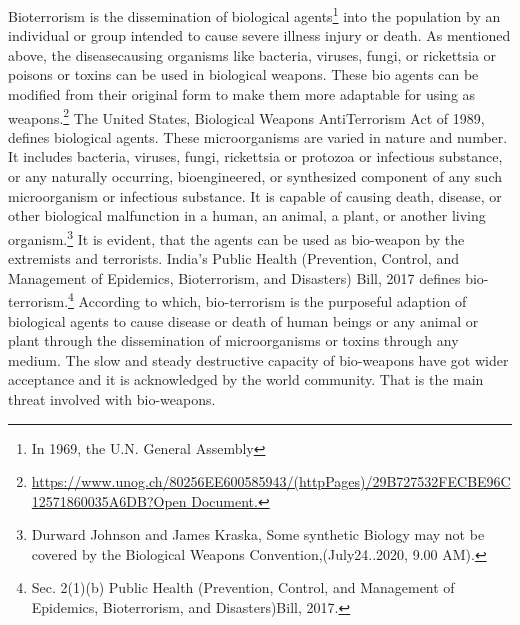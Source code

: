\begin{multicols}{2}
\noi
Bioterrorism is the dissemination of biological agents\footnote{In 1969, the U.N. General Assembly} into the population by an individual
or group intended to cause severe illness injury or death. As mentioned above, the diseasecausing organisms like bacteria, viruses, fungi, or rickettsia or poisons or toxins can be used
in biological weapons. These bio agents can be modified from their original form to make 
them more adaptable for using as weapons.\footnote{\url{https://www.unog.ch/80256EE600585943/(httpPages)/29B727532FECBE96C12571860035A6DB?}\break \url{Open Document.}} The United States, Biological Weapons AntiTerrorism Act of 1989, defines biological agents. These microorganisms are varied in nature
and number. It includes bacteria, viruses, fungi, rickettsia or protozoa or infectious substance,
or any naturally occurring, bioengineered, or synthesized component of any such
microorganism or infectious substance. It is capable of causing death, disease, or other
biological malfunction in a human, an animal, a plant, or another living organism.\footnote{Durward Johnson and James Kraska, Some synthetic Biology may not be covered by the Biological Weapons
Convention,(July24..2020, 9.00 AM).} It is
evident, that the agents can be used as bio-weapon by the extremists and terrorists. India's
Public Health (Prevention, Control, and Management of Epidemics, Bioterrorism, and
Disasters) Bill, 2017 defines bio-terrorism.\footnote{Sec. 2(1)(b) Public Health (Prevention, Control, and Management of Epidemics, Bioterrorism, and
Disasters)Bill, 2017.} According to which, bio-terrorism is the
purposeful adaption of biological agents to cause disease or death of human beings or any
animal or plant through the dissemination of microorganisms or toxins through any medium.
The slow and steady destructive capacity of bio-weapons have got wider acceptance and it is
acknowledged by the world community. That is the main threat involved with bio-weapons. 



\end{multicols}
